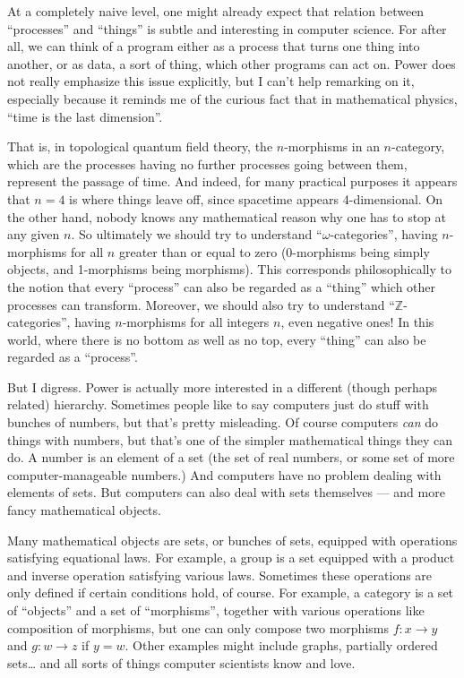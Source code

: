 \documentclass{article}
\begin{document}
At a completely naive level, one might already expect that relation
between ``processes'' and ``things'' is subtle and interesting in
computer science. For after all, we can think of a program either as a
process that turns one thing into another, or as data, a sort of thing,
which other programs can act on. Power does not really emphasize this
issue explicitly, but I can't help remarking on it, especially because
it reminds me of the curious fact that in mathematical physics, ``time
is the last dimension''.

That is, in topological quantum field theory, the \(n\)-morphisms in an
\(n\)-category, which are the processes having no further processes
going between them, represent the passage of time. And indeed, for many
practical purposes it appears that \(n = 4\) is where things leave off,
since spacetime appears 4-dimensional. On the other hand, nobody knows
any mathematical reason why one has to stop at any given \(n\). So
ultimately we should try to understand ``\(\omega\)-categories'', having
\(n\)-morphisms for all \(n\) greater than or equal to zero (0-morphisms
being simply objects, and 1-morphisms being morphisms). This corresponds
philosophically to the notion that every ``process'' can also be
regarded as a ``thing'' which other processes can transform. Moreover,
we should also try to understand ``\(\mathbb{Z}\)-categories'', having
\(n\)-morphisms for all integers \(n\), even negative ones! In this
world, where there is no bottom as well as no top, every ``thing'' can
also be regarded as a ``process''.

But I digress. Power is actually more interested in a different (though
perhaps related) hierarchy. Sometimes people like to say computers just
do stuff with bunches of numbers, but that's pretty misleading. Of
course computers \emph{can} do things with numbers, but that's one of
the simpler mathematical things they can do. A number is an element of a
set (the set of real numbers, or some set of more computer-manageable
numbers.) And computers have no problem dealing with elements of sets.
But computers can also deal with sets themselves --- and more fancy
mathematical objects.

Many mathematical objects are sets, or bunches of sets, equipped with
operations satisfying equational laws. For example, a group is a set
equipped with a product and inverse operation satisfying various laws.
Sometimes these operations are only defined if certain conditions hold,
of course. For example, a category is a set of ``objects'' and a set of
``morphisms'', together with various operations like composition of
morphisms, but one can only compose two morphisms \(f\colon x\to y\) and
\(g\colon w\to z\) if \(y = w\). Other examples might include graphs,
partially ordered sets\ldots{} and all sorts of things computer
scientists know and love.
\end{document}

